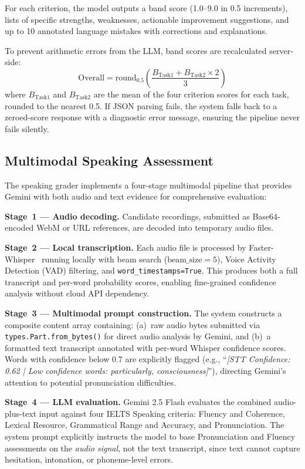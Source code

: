 \documentclass[conference]{IEEEtran}
\begin{document}
For each criterion, the model outputs a band score (1.0--9.0 in 0.5 increments), lists of specific strengths, weaknesses, actionable improvement suggestions, and up to 10 annotated language mistakes with corrections and explanations.

To prevent arithmetic errors from the LLM, band scores are recalculated server-side:
\begin{equation}
\text{Overall} = \text{round}_{0.5}\!\left(\frac{B_{\text{Task1}} + B_{\text{Task2}} \times 2}{3}\right)
\label{eq:overall}
\end{equation}
where $B_{\text{Task1}}$ and $B_{\text{Task2}}$ are the mean of the four criterion scores for each task, rounded to the nearest 0.5. If JSON parsing fails, the system falls back to a zeroed-score response with a diagnostic error message, ensuring the pipeline never fails silently.

\subsection{Multimodal Speaking Assessment}

The speaking grader implements a four-stage multimodal pipeline that provides Gemini with both audio and text evidence for comprehensive evaluation:

\textbf{Stage~1 --- Audio decoding.} Candidate recordings, submitted as Base64-encoded WebM or URL references, are decoded into temporary audio files.

\textbf{Stage~2 --- Local transcription.} Each audio file is processed by Faster-Whisper~\cite{faster_whisper,whisper_paper} running locally with beam search ($\text{beam\_size}=5$), Voice Activity Detection (VAD) filtering, and \texttt{word\_timestamps=True}. This produces both a full transcript and per-word probability scores, enabling fine-grained confidence analysis without cloud API dependency.

\textbf{Stage~3 --- Multimodal prompt construction.} The system constructs a composite content array containing: (a)~raw audio bytes submitted via \texttt{types.Part.from\_bytes()} for direct audio analysis by Gemini, and (b)~a formatted text transcript annotated with per-word Whisper confidence scores. Words with confidence below 0.7 are explicitly flagged (e.g., ``\textit{[STT Confidence: 0.62 | Low confidence words: particularly, consciousness]}''), directing Gemini's attention to potential pronunciation difficulties.

\textbf{Stage~4 --- LLM evaluation.} Gemini 2.5 Flash evaluates the combined audio-plus-text input against four IELTS Speaking criteria: Fluency and Coherence, Lexical Resource, Grammatical Range and Accuracy, and Pronunciation. The system prompt explicitly instructs the model to base Pronunciation and Fluency assessments on the \emph{audio signal}, not the text transcript, since text cannot capture hesitation, intonation, or phoneme-level errors.
\end{document}
